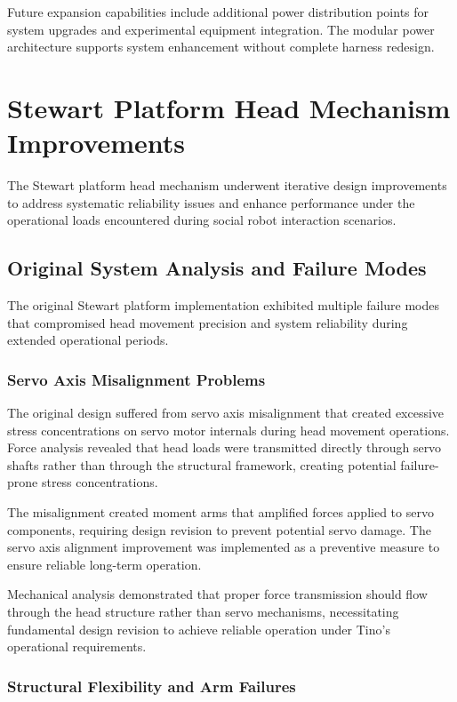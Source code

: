 Future expansion capabilities include additional power distribution points for system upgrades and experimental equipment integration. The modular power architecture supports system enhancement without complete harness redesign.

\section{Stewart Platform Head Mechanism Improvements}

The Stewart platform head mechanism underwent iterative design improvements to address systematic reliability issues and enhance performance under the operational loads encountered during social robot interaction scenarios.

\subsection{Original System Analysis and Failure Modes}

The original Stewart platform implementation exhibited multiple failure modes that compromised head movement precision and system reliability during extended operational periods.

\subsubsection{Servo Axis Misalignment Problems}

The original design suffered from servo axis misalignment that created excessive stress concentrations on servo motor internals during head movement operations. Force analysis revealed that head loads were transmitted directly through servo shafts rather than through the structural framework, creating potential failure-prone stress concentrations.

The misalignment created moment arms that amplified forces applied to servo components, requiring design revision to prevent potential servo damage. The servo axis alignment improvement was implemented as a preventive measure to ensure reliable long-term operation.

Mechanical analysis demonstrated that proper force transmission should flow through the head structure rather than servo mechanisms, necessitating fundamental design revision to achieve reliable operation under Tino's operational requirements.

\subsubsection{Structural Flexibility and Arm Failures}

